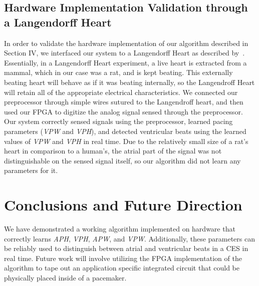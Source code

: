 \documentclass[conference]{IEEEtran}
\newcommand{\APW}{\textit{APW}}
\newcommand{\VPW}{\textit{VPW}}
\newcommand{\APH}{\textit{APH}}
\newcommand{\VPH}{\textit{VPH}}
\begin{document}
\subsection{Hardware Implementation Validation through a Langendorff Heart}
In order to validate the hardware implementation of
our algorithm described in Section IV, we interfaced our
system to a Langendorff Heart as described by~\cite{langendorff}.
Essentially, in a Langendorff Heart experiment, a live
heart is extracted from a mammal, which in our case was
a rat, and is kept beating. This externally beating heart
will behave as if it was beating internally, so the
Langendroff Heart will retain all of the appropriate
electrical characteristics.
We connected our preprocessor through simple wires
sutured to the Langendroff heart, and then used our
FPGA to digitize the analog signal sensed through the
preprocessor. Our system correctly sensed signals using
the preprocessor, learned pacing parameters (\VPW{} and
\VPH{}), and detected ventricular beats using the learned
values of \VPW{} and \VPH{} in real time. Due to the
relatively small size of a rat's heart in comparison to a
human's, the atrial part of the signal was not
distinguishable on the sensed signal itself, so our
algorithm did not learn any parameters for it.

\section{Conclusions and Future Direction}
We have demonstrated a working algorithm
implemented on hardware that correctly learns \APH{},
\VPH{}, \APW{}, and \VPW{}. Additionally, these parameters
can be reliably used to distinguish between atrial and
ventricular beats in a CES in real time. Future
work will involve utilizing the FPGA implementation of
the algorithm to tape out an application specific
integrated circuit that could be physically placed inside
of a pacemaker.

%
%
\end{document}

